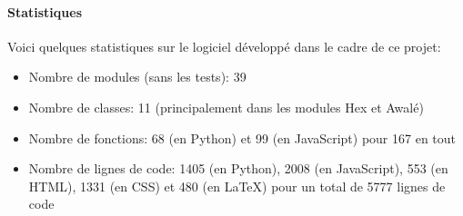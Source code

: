 \paragraph{Statistiques}
Voici quelques statistiques sur le logiciel développé dans le cadre de ce projet:
\begin{itemize}
    \item Nombre de modules (sans les tests): 39
    \item Nombre de classes: 11 (principalement dans les modules Hex et Awalé)
    \item Nombre de fonctions: 68 (en Python) et 99 (en JavaScript) pour 167 en tout
    \item Nombre de lignes de code: 1405 (en Python), 2008 (en JavaScript), 553 (en HTML), 1331 (en CSS)
    et 480 (en \LaTeX) pour un total de 5777 lignes de code
\end{itemize}